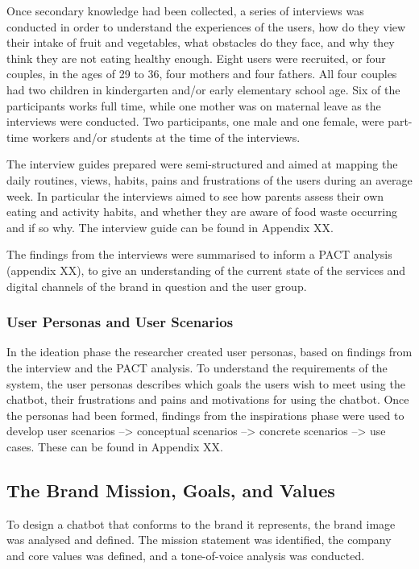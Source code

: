    Once secondary knowledge had been collected, a series of interviews was conducted in order to understand the experiences of the users, how do they view their intake of fruit and vegetables, what obstacles do they face, and why they think they are not eating healthy enough. Eight users were recruited, or four couples, in the ages of 29 to 36, four mothers and four fathers. All four couples had two children in kindergarten and/or early elementary school age. Six of the participants works full time, while one mother was on maternal leave as the interviews were conducted. Two participants, one male and one female, were part-time workers and/or students at the time of the interviews.
   
   The interview guides prepared were semi-structured and aimed at mapping the daily routines, views, habits, pains and frustrations of the users during an average week. In particular the interviews aimed to see how parents assess their own eating and activity habits, and whether they are aware of food waste occurring and if so why. The interview guide can be found in Appendix XX. 
   
   The findings from the interviews were summarised to inform a PACT analysis (appendix XX), to give an understanding of the current state of the services and digital channels of the brand in question and the user group.

\vspace{2,5mm} %

    \subsubsection{User Personas and User Scenarios}
    
    In the ideation phase the researcher created user personas, based on findings from the interview and the PACT analysis. To understand the requirements of the system, the user personas describes which goals the users wish to meet using the chatbot, their frustrations and pains and motivations for using the chatbot. Once the personas had been formed, findings from the inspirations phase were used to develop user scenarios --> conceptual scenarios --> concrete scenarios --> use cases. These can be found in Appendix XX.
    
    
\vspace{2,5mm} %

    \subsection{The Brand Mission, Goals, and Values}
    To design a chatbot that conforms to the brand it represents, the brand image was analysed and defined. The mission statement was identified, the company and core values was defined, and a tone-of-voice analysis was conducted.
    
